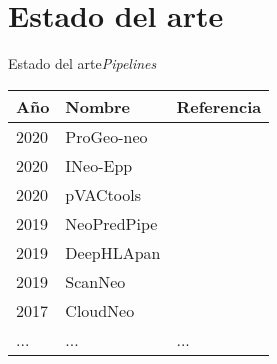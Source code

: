\documentclass[10pt]{beamer}
\newcommand{\1}{
	\setbeamertemplate{background}{
		\texttt{[image: img/1]}
		\tikz[overlay] \fill[fill opacity=0.75,fill=white] (0,0) rectangle (-\paperwidth,\paperheight);
	}
}
\begin{document}
\section{Estado del arte}



\begin{frame}{Estado del arte}{\textit{Pipelines}}
	\begin{table}[]
		\setlength{\tabcolsep}{0.5em} %
		{\renewcommand{\arraystretch}{1.4}%
			\begin{tabular}{lp{5cm}l}
				\textbf{Año} & \textbf{Nombre} & \textbf{Referencia}  \\ \hline
				2020  & ProGeo-neo     &\cite{li2020progeo}   \\
				2020  & INeo-Epp     &\cite{wang2020ineo}   \\
				2020  & pVACtools     &\cite{hundal2020pvactools}   \\
				2019  & NeoPredPipe     &\cite{schenck2019neopredpipe}   \\
				2019  & DeepHLApan     &\cite{wu2019deephlapan}   \\
				2019  & ScanNeo     &\cite{wang2019scanneo}   \\     
				2017  & CloudNeo     &\cite{bais2017cloudneo}   \\     
				... & ... & ... \\              
			\end{tabular}
		}
	\end{table}
\end{frame}
\end{document}
